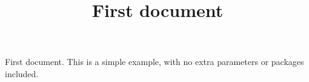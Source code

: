 \documentclass[12pt, a4paper]{article}
\title{First document}
\begin{document}
First document. This is a simple example, with no extra parameters or packages included.
\end{document}
